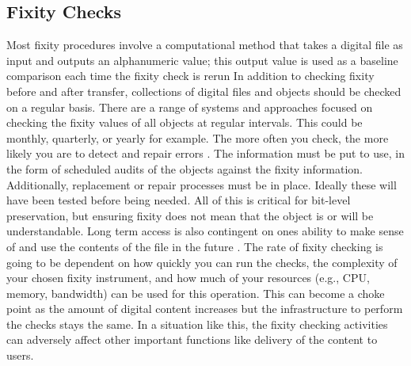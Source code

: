 \subsection{Fixity Checks}
Most fixity procedures involve a computational method that takes a digital file as input and outputs an alphanumeric value; this output value is used as a baseline comparison each time the fixity check is rerun \cite[5]{ndsa2017fixity}
In addition to checking fixity before and after transfer, collections of digital files and objects should be checked on a regular basis. There are a range of systems and approaches focused on checking the fixity values of all objects at regular intervals. This could be monthly, quarterly, or yearly for example. The more often you check, the more likely you are to detect and repair errors \cite[4]{ndsa2014fixity}.
The information must be put to use, in the form of scheduled audits of the objects against the fixity information. Additionally, replacement or repair processes must be in place. Ideally these will have been tested before being needed. All of this is critical for bit-level preservation, but ensuring fixity does not mean that the object is or will be understandable. Long term access is also contingent on ones ability to make sense of and use the contents of the file in the future \cite[2]{ndsa2014fixity}.
The rate of fixity checking is going to be dependent on how quickly you can run the checks, the complexity of your chosen fixity instrument, and how much of your resources (e.g., CPU, memory, bandwidth) can be used for this operation. This can become a choke point as the amount of digital content increases but the infrastructure to perform the checks stays the same. In a situation like this, the fixity checking activities can adversely affect other important functions like delivery of the content to users.
